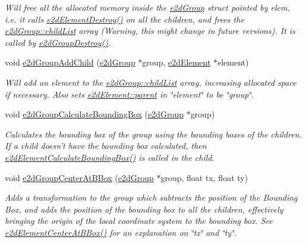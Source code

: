 \begin{DoxyCompactItemize}
\begin{DoxyCompactList}\small\item\em Will free all the allocated memory inside the \hyperlink{structe2d_group}{e2d\-Group} struct pointed by elem, i.\-e. it calls \hyperlink{group__e2d_element_ga214c437a16fe6f3fc795539f851a2019}{e2d\-Element\-Destroy()} on all the children, and frees the \hyperlink{structe2d_group_a55f6dde874716dc99dcd270fc0999a01}{e2d\-Group\-::child\-List} array (Warning, this might change in future versions). It is called by \hyperlink{group__e2d_group_ga545626effa0f89b72f244e56aadb05bc}{e2d\-Group\-Destroy()}. \end{DoxyCompactList}\item 
void \hyperlink{group__e2d_group_ga6ae76730f78ad731621e9286a3980b8a}{e2d\-Group\-Add\-Child} (\hyperlink{structe2d_group}{e2d\-Group} $\ast$group, \hyperlink{structe2d_element}{e2d\-Element} $\ast$element)
\begin{DoxyCompactList}\small\item\em Will add an element to the \hyperlink{structe2d_group_a55f6dde874716dc99dcd270fc0999a01}{e2d\-Group\-::child\-List} array, increasing allocated space if necessary. Also sets \hyperlink{structe2d_element_a3e62eb2fbf1d6bc6d6fe549096a6cee9}{e2d\-Element\-::parent} in \char`\"{}element\char`\"{} to be \char`\"{}group\char`\"{}. \end{DoxyCompactList}\item 
void \hyperlink{group__e2d_group_ga7c5f43489bbd2d36a51414aee07abf5a}{e2d\-Group\-Calculate\-Bounding\-Box} (\hyperlink{structe2d_group}{e2d\-Group} $\ast$group)
\begin{DoxyCompactList}\small\item\em Calculates the bounding box of the group using the bounding boxes of the children. If a child doesn't have the bounding box calculated, then \hyperlink{group__e2d_element_ga94aa710b2da71af2091fe4d5b87ce47e}{e2d\-Element\-Calculate\-Bounding\-Box()} is called in the child. \end{DoxyCompactList}\item 
void \hyperlink{group__e2d_group_ga04bf94419865ca7f9d6daf30ce3fadf0}{e2d\-Group\-Center\-At\-B\-Box} (\hyperlink{structe2d_group}{e2d\-Group} $\ast$group, float tx, float ty)
\begin{DoxyCompactList}\small\item\em Adds a transformation to the group which subtracts the position of the Bounding Box, and adds the position of the bounding box to all the children, effectively bringing the origin of the local coordinate system to the bounding box. See \hyperlink{group__e2d_element_ga36b01a888c97163c990e16d348aff61c}{e2d\-Element\-Center\-At\-B\-Box()} for an explanation on \char`\"{}tx\char`\"{} and \char`\"{}ty\char`\"{}. \end{DoxyCompactList}\item 

\end{DoxyCompactItemize}
